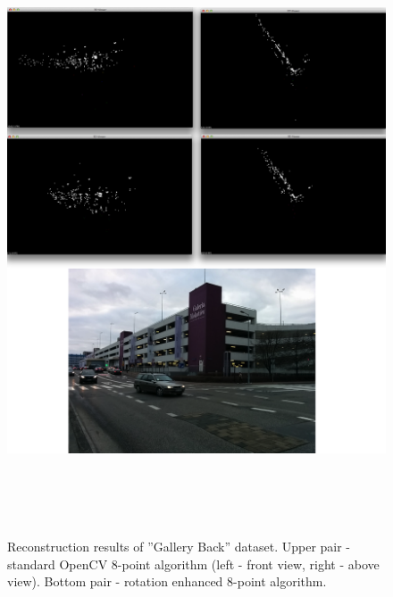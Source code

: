 \begin{figure}[p]
    \centering
    \includegraphics[height=18cm]{GalleryBack4000Comparison}
    \caption[Reconstruction results of ''Gallery Back'' dataset]{Reconstruction results of ''Gallery Back'' dataset. Upper pair - standard OpenCV 8-point algorithm (left - front view, right - above view). Bottom pair - rotation enhanced 8-point algorithm.}
\end{figure}

